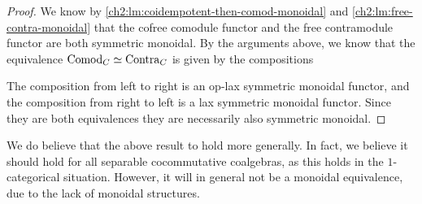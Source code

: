 \begin{proof}

    We know by \cref{ch2:lm:coidempotent-then-comod-monoidal} and \cref{ch2:lm:free-contra-monoidal} that the cofree comodule functor and the free contramodule functor are both symmetric monoidal. By the arguments above, we know that the equivalence $\mathrm{Comod}_C\simeq \mathrm{Contra}_C$ is given by the compositions 
    \begin{center}
    \end{center}
    The composition from left to right is an op-lax symmetric monoidal functor, and the composition from right to left is a lax symmetric monoidal functor. Since they are both equivalences they are necessarily also symmetric monoidal. 
\end{proof}

\begin{remark}
    \label{ch2:rm:holds-generally-for-separable}
    We do believe that the above result to hold more generally. In fact, we believe it should hold for all separable cocommutative coalgebras, as this holds in the $1$-categorical situation. However, it will in general not be a monoidal equivalence, due to the lack of monoidal structures. 
\end{remark}


